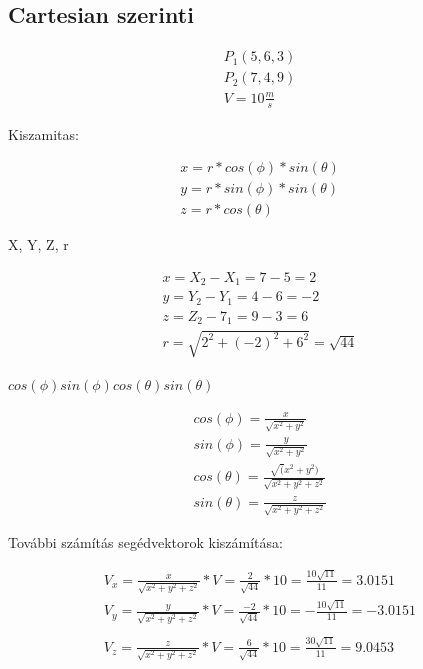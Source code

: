 \subsection{Cartesian szerinti}
\begin{gather}
    P_1(5,6,3) \\
    P_2(7,4,9) \\
    V = 10 \frac{m}{s}
\end{gather}


Kiszamitas:

\begin{gather}
    x = r * cos(\phi) * sin(\theta) \\
    y = r * sin(\phi) * sin(\theta) \\
    z = r * cos(\theta)
\end{gather}


X, Y, Z, r

\begin{gather}
    x = X_2 - X_1 = 7 - 5 = 2 \\
    y = Y_2 - Y_1 = 4 - 6 = -2 \\
    z = Z_2 - 7_1 = 9 - 3 = 6 \\
    r = \sqrt{2^2 + (-2)^2 + 6^2} = \sqrt{44}
\end{gather}

$
cos(\phi) sin(\phi) cos(\theta) sin(\theta)
$

\begin{gather}
    cos(\phi) = \frac{x}{\sqrt{x^2 + y^2}} \\
    sin(\phi) = \frac{y}{\sqrt{x^2 + y^2}} \\
    cos(\theta) = \frac{\sqrt(x^2 + y^2)}{\sqrt{x^2 + y^2 + z^2}} \\
    sin(\theta) = \frac{z}{\sqrt{x^2 + y^2 + z^2}}
\end{gather}

\newpage

További számítás segédvektorok kiszámítása:

\begin{gather}
    V_x = \frac{x}{\sqrt{x^2 + y^2 + z^2}} *V = \frac{2}{\sqrt{44}} * 10 = \frac{10\sqrt{11}}{11} = 3.0151\\
    V_y = \frac{y}{\sqrt{x^2 + y^2 + z^2}} *V = \frac{-2}{\sqrt{44}} * 10 = -\frac{10\sqrt{11}}{11} = -3.0151\\\\
    V_z = \frac{z}{\sqrt{x^2 + y^2 + z^2}} *V = \frac{6}{\sqrt{44}} * 10 = \frac{30\sqrt{11}}{11} = 9.0453\\
\end{gather}

